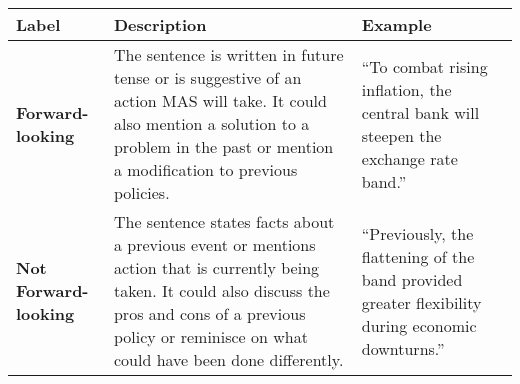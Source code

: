 \begin{table*}
    \caption{}
    \vspace{1em}
    \begin{tabular}{p{}p{}p{}}
    \toprule
    \textbf{Label} & \textbf{Description} & \textbf{Example}\\
    \midrule
    \textbf{Forward-looking} & The sentence is written in future tense or is suggestive of an action MAS will take. It could also mention a solution to a problem in the past or mention a modification to previous policies. & “To combat rising inflation, the central bank will steepen the exchange rate band.” \\
    \midrule
    \textbf{Not Forward-looking} & The sentence states facts about a previous event or mentions action that is currently being taken. It could also discuss the pros and cons of a previous policy or reminisce on what could have been done differently.  & “Previously, the flattening of the band provided greater flexibility during economic downturns.” \\
    \bottomrule
    \end{tabular}
    \label{tb:mas_forward_looking_guide}
\end{table*}